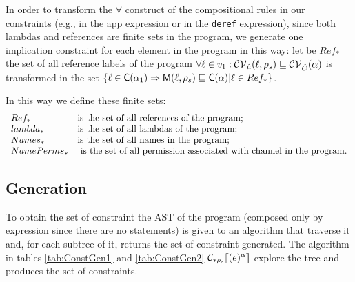 In order to transform the $\forall$ construct of the compositional rules in our constraints (e.g., in the app expression or in the \texttt{deref} expression), since both lambdas and references are finite sets in the program, we generate one implication constraint for each element in the program in this way: let be $Ref_*$ the set of all reference labels of the program $\forall \ell \in v_1: \mathcal{CV}_{\hat{\mu}}(\ell, \rho_s) \sqsubseteq \mathcal{CV}_{\hat{C}}(\alpha)$ is transformed in the set $\{ \ell \in \mathsf{C}(\alpha_1) \Rightarrow \mathsf{M}(\ell, \rho_s) \sqsubseteq \mathsf{C}(\alpha) | \ell \in Ref_* \}$.

In this way we define these finite sets:
\[
\begin{array}{l l}
Ref_* & $is the set of all references of the program;$\\
lambda_* & $is the set of all lambdas of the program;$\\
Names_* & $is the set of all names in the program;$\\
NamePerms_* & $ is the set of all permission associated with channel in the program.$\\
\end{array}
\]

\subsection{Generation}
To obtain the set of constraint the AST of the program (composed only by expression since there are no statements) is given to an algorithm that traverse it and, for each subtree of it, returns the set of constraint generated. The algorithm in tables \ref{tab:ConstGen1} and \ref{tab:ConstGen2} $\mathcal{C}_{*\rho_s}\llbracket (e)^\alpha \rrbracket$ explore the tree and produces the set of constraints.

